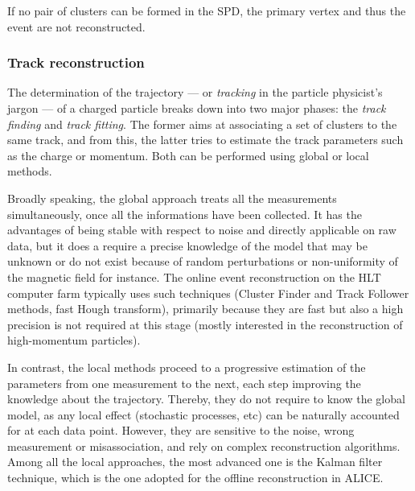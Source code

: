If no pair of clusters can be formed in the SPD, the primary vertex and thus the event are not reconstructed.

\subsubsection{Track reconstruction}
\label{subsubsec:TrackReco}

The determination of the trajectory --- or \textit{tracking} in the particle physicist's jargon --- of a charged particle breaks down into two major phases: the \textit{track finding} and \textit{track fitting}. The former aims at associating a set of clusters to the same track, and from this, the latter tries to estimate the track parameters such as the charge or momentum. Both can be performed using global or local methods.

Broadly speaking, the global approach treats all the measurements simultaneously, once all the informations have been collected. It has the advantages of being stable with respect to noise and directly applicable on raw data, but it does a require a precise knowledge of the model that may be unknown or do not exist because of random perturbations or non-uniformity of the magnetic field for instance. The online event reconstruction on the HLT computer farm typically uses such techniques (Cluster Finder and Track Follower methods, fast Hough transform), primarily because they are fast but also a high precision is not required at this stage (mostly interested in the reconstruction of high-momentum particles).

In contrast, the local methods proceed to a progressive estimation of the parameters  from one measurement to the next, each step improving the knowledge about the trajectory. Thereby, they do not require to know the global model, as any local effect (stochastic processes, etc) can be naturally accounted for at each data point. However, they are sensitive to the noise, wrong measurement or misassociation, and rely on complex reconstruction algorithms. Among all the local approaches, the most advanced one is the Kalman filter technique, which is the one adopted for the offline reconstruction in ALICE. 

